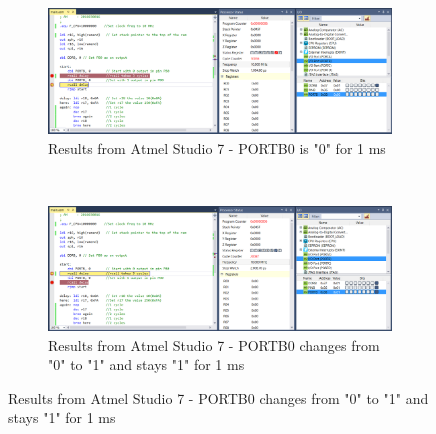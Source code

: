 \documentclass{article}
\begin{document}
	\begin{figure}[h!]
		\centering
		\begin{subfigure}[t]{0.5\textwidth}
			\centering
			\includegraphics[width=\linewidth]{./results/lab1a_atmel_result_a.png}
			\caption{Results from Αtmel Studio 7 - PORTB0 is "0" for 1 ms}
		\end{subfigure}%
		~
		\begin{subfigure}[t]{0.5\textwidth}
			\centering
			\includegraphics[width=\linewidth]{./results/lab1a_atmel_result_b.png}
			\caption{Results from Αtmel Studio 7 - PORTB0 changes from "0" to "1" and stays "1" for 1 ms}
		\end{subfigure}


\end{figure}
\end{document}
